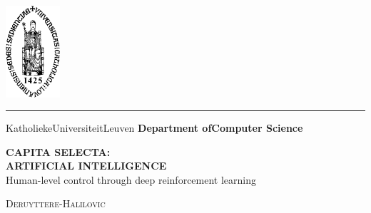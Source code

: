 \documentclass{report}
\begin{document}
\begin{titlepage}
	\newpage
	\thispagestyle{empty}
	\frenchspacing
	\hspace{-0.2cm}
	\includegraphics[height=3.4cm]{sedes}
	\hspace{0.2cm}
	\rule{0.5pt}{3.4cm}
	\hspace{0.2cm}
	\begin{minipage}[b]{8cm}
		\Large{Katholieke\newline Universiteit\newline Leuven}\smallskip\newline
		\large{}\smallskip\newline
		\textbf{Department of\newline Computer Science}\smallskip
	\end{minipage}
	\vspace*{3.2cm}\vfill
	\begin{center}
		\begin{minipage}[t]{\textwidth}
			\begin{center}
				\LARGE{\rm{\textbf{\uppercase{Capita Selecta:\\Artificial Intelligence}}}}\\
				\Large{\rm{Human-level control through deep reinforcement learning}}\\
				\vspace{0.5cm}

			    \large{\textsc{Deruyttere-Halilovic}}%

			\end{center}
		\end{minipage}
	\end{center}
	\vfill
	\hfill{}
\end{titlepage}

\newpage
\tableofcontents
\newpage
\end{document}
